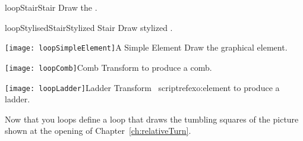 \begin{exofigwithtitle}{loopStair}{Stair}\label{exo:stair}
Draw the .
\end{exofigwithtitle}



\begin{exofigwithtitle}{loopStylisedStair}{Stylized Stair}\label{exo:stylizedstair}
Draw  stylized .
\end{exofigwithtitle}

\begin{exofigwithsizeandtitle}{\texttt{[image: loopSimpleElement]}}{A Simple Element}\label{exo:element}
Draw the  graphical element.
\end{exofigwithsizeandtitle}




\begin{exofigwithsizeandtitle}[0.3]{\texttt{[image: loopComb]}}{Comb}\label{exo:comb}
Transform   to produce a comb.
\end{exofigwithsizeandtitle}



\begin{exofigwithsizeandtitle}{\texttt{[image: loopLadder]}}{Ladder}\label{exo:ladder}
Transform  \
 scriptref{exo:element} to produce a ladder.
\end{exofigwithsizeandtitle}




\begin{exonofig}
Now that you  loops\add{,} define a loop that draws the tumbling squares of the picture shown at the opening of Chapter~\ref{ch:relativeTurn}.
\end{exonofig}




